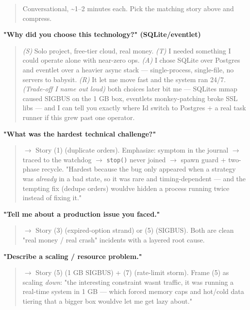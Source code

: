 \documentclass[11pt]{article}
\begin{document}
\begin{quote}
Conversational, \textasciitilde1--2 minutes each. Pick the matching story above and compress.
\end{quote}

\textbf{"Why did you choose this technology?" (SQLite/eventlet)}

\begin{quote}
\emph{(S)} Solo project, free-tier cloud, real money. \emph{(T)} I needed something I could operate
alone with near-zero ops. \emph{(A)} I chose SQLite over Postgres and eventlet over a heavier async
stack --- single-process, single-file, no servers to babysit. \emph{(R)} It let me move fast and the
system ran 24/7. \emph{(Trade-off I name out loud)} both choices later bit me --- SQLite\textquotesingle s mmap caused
SIGBUS on the 1 GB box, eventlet\textquotesingle s monkey-patching broke SSL libs --- and I can tell you exactly
where I\textquotesingle d switch to Postgres + a real task runner if this grew past one operator.
\end{quote}

\textbf{"What was the hardest technical challenge?"}

\begin{quote}
\(\rightarrow\) Story (1) (duplicate orders). Emphasize: symptom in the journal \(\rightarrow\) traced to the watchdog \(\rightarrow\)
\texttt{stop()} never joined \(\rightarrow\) spawn guard + two-phase recycle. "Hardest because the bug only appeared
when a strategy was \emph{already} in a bad state, so it was rare and timing-dependent --- and the
tempting fix (dedupe orders) would\textquotesingle ve hidden a process running twice instead of fixing it."
\end{quote}

\textbf{"Tell me about a production issue you faced."}

\begin{quote}
\(\rightarrow\) Story (3) (expired-option strand) or (5) (SIGBUS). Both are clean "real money / real crash"
incidents with a layered root cause.
\end{quote}

\textbf{"Describe a scaling / resource problem."}

\begin{quote}
\(\rightarrow\) Story (5) (1 GB SIGBUS) + (7) (rate-limit storm). Frame (5) as scaling \emph{down}: "the interesting
constraint wasn\textquotesingle t traffic, it was running a real-time system in 1 GB --- which forced memory caps
and hot/cold data tiering that a bigger box would\textquotesingle ve let me get lazy about."
\end{quote}
\end{document}
